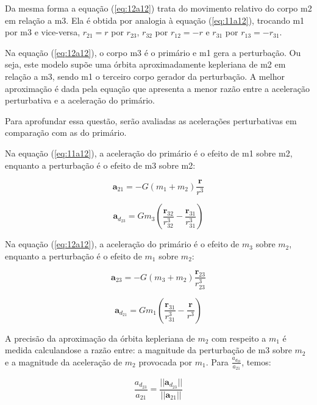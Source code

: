 \par Da mesma forma a equação (\ref{eq:12a12}) trata do movimento relativo do corpo m2 em relação a m3. Ela é obtida por analogia à equação (\ref{eq:11a12}), trocando m1 por m3 e vice-versa, $r_{21} = r$ por $r_{23}$, $r_{32}$ por $r_{12} = -r$ e $r_{31}$ por $r_{13} = -r_{31}$. 

\par Na equação (\ref{eq:12a12}), o corpo m3 é o primário e m1 gera a perturbação. Ou seja, este modelo supõe uma órbita aproximadamente kepleriana de m2 em relação a m3, sendo m1 o terceiro corpo gerador da perturbação. A melhor aproximação é dada pela equação que apresenta a menor razão entre a aceleração perturbativa e a aceleração do primário.

Para aprofundar essa questão, serão avaliadas as acelerações perturbativas em comparação com as do primário. 

Na equação (\ref{eq:11a12}), a aceleração do primário é o efeito de m1 sobre m2, enquanto a perturbação é o efeito de m3 sobre m2:

\begin{equation}
\mathbf{a}_{21}=-G(m_1+m_2)\frac{\mathbf{r}}{r^3}
\label{eq:13a12}
\end{equation}

\begin{equation}
\mathbf{a}_{d_{23}}=Gm_3\left(\frac{\mathbf{r}_{32}}{r_{32}^3}-\frac{\mathbf{r}_{31}}{r_{31}^3}\right)
\label{eq:14a12}
\end{equation}

Na equação (\ref{eq:12a12}), a aceleração do primário é o efeito de $m_3$ sobre $m_2$, enquanto a perturbação é o efeito de $m_1$ sobre $m_2$:

\begin{equation}
\mathbf{a}_{23}=-G(m_3+m_2)\frac{\mathbf{r}_{23}}{r_{23}^3}
\label{eq:15a12}
\end{equation}

\begin{equation}
\mathbf{a}_{d_{21}}=G m_1\left(\frac{\mathbf{r}_{31}}{r_{31}^3}-\frac{\mathbf{r}}{r^3}\right)
\label{eq:16a12}
\end{equation}

A precisão da aproximação da órbita kepleriana de $m_2$ com respeito a $m_1$ é medida calculandose a razão entre: a magnitude da perturbação de m3 sobre $m_2$ e a magnitude da aceleração de $m_2$ provocada por $m_1$. Para $\frac{a_{d_{23}}}{a_{21}}$, temos:

\begin{equation}
\frac{a_{d_{23}}}{a_{21}} = \frac{||\mathbf{a}_{d_{23}}||}{||\mathbf{a}_{21}||} 
\label{eq:17a12}
\end{equation}

